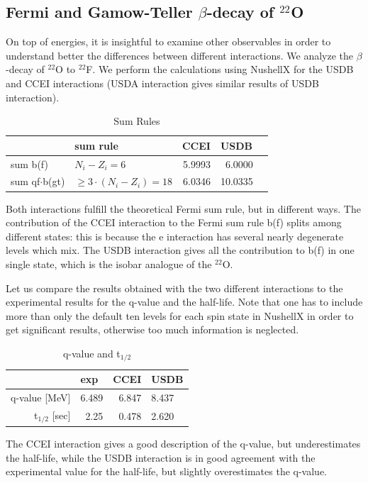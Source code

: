 \subsection{Fermi and Gamow-Teller $\beta$-decay of $^{22}$O}
%
On top of energies, it is insightful to examine other observables in order to understand better the differences between different interactions. We analyze the $\beta$-decay of $^{22}$O to $^{22}$F.
We perform the calculations using NushellX for the USDB and CCEI interactions (USDA interaction gives similar results of USDB interaction). 
\begin{table}[h!]
\caption{Sum Rules}
\begin{center}
\begin{tabular}{l@{\qquad}l@{\qquad}r@{\qquad}rl}
\hline
\multicolumn{1}{l}{\rule{0pt}{12pt}
                   }&\multicolumn{1}{l}{\rule{0pt}{12pt} sum rule}&\multicolumn{1}{l}{CCEI}&\multicolumn{2}{l}{USDB}\\[2pt]
\hline\rule{0pt}{12pt}
sum b(f)            &  $N_i-Z_i=6$   & 5.9993 & 6.0000 &\\
sum qf$\cdot$b(gt)  &  $\ge 3\cdot(N_i-Z_i)=18$  & 6.0346 & 10.0335 &\\[2pt]
\hline
\end{tabular}
\end{center}
\end{table}

Both interactions fulfill the theoretical Fermi sum rule, but in different ways.
The contribution of the CCEI interaction to the Fermi sum rule b(f) splits among different states: this is because the e interaction has several nearly degenerate levels which mix. The USDB interaction gives all the contribution to b(f) in one single state, which is the isobar analogue of the $^{22}$O.

Let us compare the results obtained with the two different interactions to the experimental results for the q-value and the half-life. Note that one has to include more than only the default ten levels for each spin state in NushellX in order to get significant results, otherwise too much information is neglected.
\begin{table}[h!]
\caption{q-value and t$_{1/2}$}
\begin{center}
\begin{tabular}{r@{\qquad}r@{\qquad}r@{\qquad}r@{\qquad}l}
\hline
\multicolumn{1}{l}{\rule{0pt}{12pt}
                   }&\multicolumn{1}{l}{exp}&\multicolumn{1}{l}{CCEI}&\multicolumn{2}{l}{USDB}\\[2pt]
\hline\rule{0pt}{12pt}
q-value [MeV]   &     6.489 & 6.847 & 8.437 &\\
t$_{1/2}$ [sec] &     2.25  & 0.478 & 2.620 &\\[2pt]
\hline
\end{tabular}
\end{center}
\end{table}

The CCEI interaction gives a good description of the q-value, but underestimates the half-life, while the USDB interaction is in good agreement with the experimental value for the half-life, but slightly overestimates the q-value.
